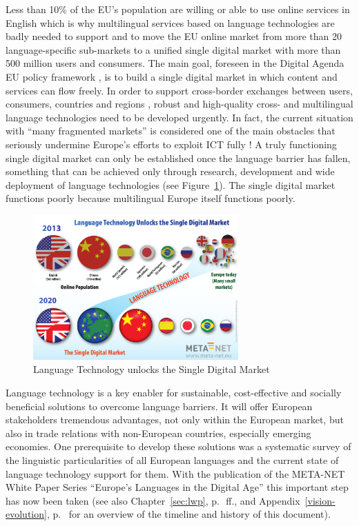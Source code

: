 \documentclass[10pt, plain]{../../metanetpaper}
\begin{document}
\begin{multicols}{2}
Less than 10\% of the EU's population are willing or able to use online services in English which is why multilingual services based on language technologies are badly needed to support and to move the EU online market from more than 20 language-specific sub-markets to a unified single digital market with more than 500 million users and consumers. The main goal, foreseen in the Digital Agenda EU policy framework \cite{DA2010}, is to build a single digital market in which content and services can flow freely. In order to support cross-border exchanges between users, consumers, countries and regions \cite{economist12}, robust and high-quality cross- and multilingual language technologies need to be developed urgently. In fact, the current situation with ``many fragmented markets'' is considered one of the main obstacles that seriously undermine Europe's efforts to exploit ICT fully \cite{DA2010}! A truly functioning single digital market can only be established once the language barrier has fallen, something that can be achieved only through research, development and wide deployment of language technologies (see Figure~\ref{fig:single-digital-market}). The single digital market functions poorly because multilingual Europe itself functions poorly.

\begin{figure}[htb]
  \center
  \includegraphics[width=0.7\textwidth]{../_media/single-digital-market}
  \caption{Language Technology unlocks the Single Digital Market}
  \label{fig:single-digital-market}
\end{figure}

Language technology is a key enabler for sustainable, cost-effective and socially beneficial solutions to overcome language barriers. It will offer European stakeholders tremendous advantages, not only within the European market, but also in trade relations with non-European countries, especially emerging economies. One prerequisite to develop these solutions was a systematic survey of the linguistic particularities of all European languages and the current state of language technology support for them. With the publication of the META-NET White Paper Series ``Europe's Languages in the Digital Age'' \cite{LWP2012} this important step has now been taken (see also Chapter~\ref{sec:lwp}, p.~\pageref{sec:lwp}\,ff., and Appendix~\ref{vision-evolution}, p.~\pageref{vision-evolution} for an overview of the timeline and history of this document).


\end{multicols}
\end{document}
